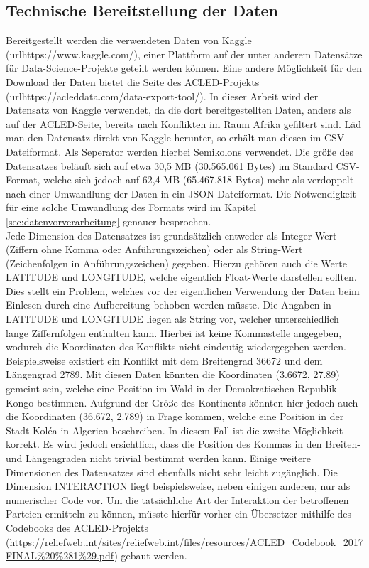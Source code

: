 \documentclass[usegeometry=true]{scrartcl}
\begin{document}
\subsection{Technische Bereitstellung der Daten}

Bereitgestellt werden die verwendeten Daten von Kaggle (url{https://www.kaggle.com/}), einer Plattform auf der unter anderem Datensätze für Data-Science-Projekte geteilt werden können. Eine andere Möglichkeit für den Download der Daten bietet die Seite des ACLED-Projekts (url{https://acleddata.com/data-export-tool/}). In dieser Arbeit wird der Datensatz von Kaggle verwendet, da die dort bereitgestellten Daten, anders als auf der ACLED-Seite, bereits nach Konflikten im Raum Afrika gefiltert sind. Läd man den Datensatz direkt von Kaggle herunter, so erhält man diesen im CSV-Dateiformat. Als Seperator werden hierbei Semikolons verwendet. Die größe des Datensatzes beläuft sich auf etwa 30,5 MB (30.565.061 Bytes) im Standard CSV-Format, welche sich jedoch auf 62,4 MB (65.467.818 Bytes) mehr als verdoppelt nach einer Umwandlung der Daten in ein JSON-Dateiformat. Die Notwendigkeit für eine solche Umwandlung des Formats wird im Kapitel \ref{sec:datenvorverarbeitung} genauer besprochen.\\ Jede Dimension des Datensatzes ist grundsätzlich entweder als Integer-Wert (Ziffern ohne Komma oder Anführungszeichen) oder als String-Wert (Zeichenfolgen in Anführungszeichen) gegeben. Hierzu gehören auch die Werte LATITUDE und LONGITUDE, welche eigentlich Float-Werte darstellen sollten. Dies stellt ein Problem, welches vor der eigentlichen Verwendung der Daten beim Einlesen durch eine Aufbereitung behoben werden müsste. Die Angaben in LATITUDE und LONGITUDE liegen als String vor, welcher unterschiedlich lange Ziffernfolgen enthalten kann. Hierbei ist keine Kommastelle angegeben, wodurch die Koordinaten des Konflikts nicht eindeutig wiedergegeben werden. Beispielsweise existiert ein Konflikt mit dem Breitengrad 36672 und dem Längengrad 2789. Mit diesen Daten könnten die Koordinaten (3.6672, 27.89) gemeint sein, welche eine Position im Wald in der Demokratischen Republik Kongo bestimmen. Aufgrund der Größe des Kontinents könnten hier jedoch auch die Koordinaten (36.672, 2.789) in Frage kommen, welche eine Position in der Stadt Koléa in Algerien beschreiben. In diesem Fall ist die zweite Möglichkeit korrekt. Es wird jedoch ersichtlich, dass die Position des Kommas in den Breiten- und Längengraden nicht trivial bestimmt werden kann. Einige weitere Dimensionen des Datensatzes sind ebenfalls nicht sehr leicht zugänglich. Die Dimension INTERACTION liegt beispielsweise, neben einigen anderen, nur als numerischer Code vor. Um die tatsächliche Art der Interaktion der betroffenen Parteien ermitteln zu können, müsste hierfür vorher ein Übersetzer mithilfe des Codebooks des ACLED-Projekts (\url{https://reliefweb.int/sites/reliefweb.int/files/resources/ACLED_Codebook_2017FINAL%20%281%29.pdf}) gebaut werden.\\
\end{document}
